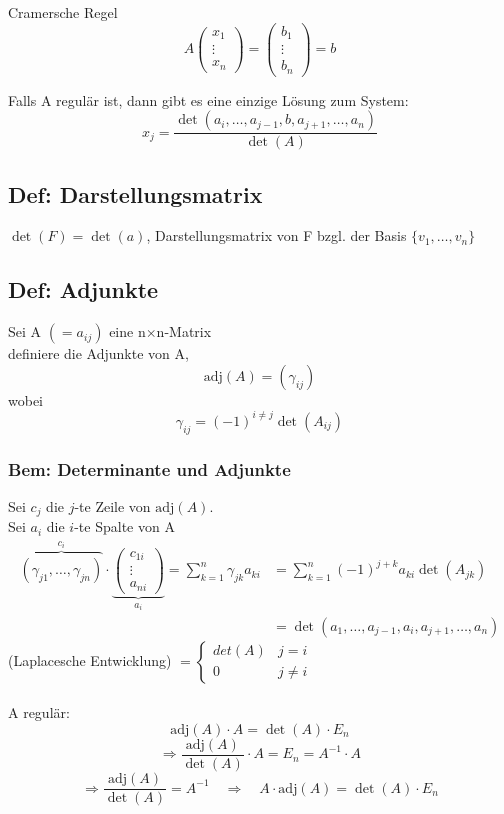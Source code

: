 \documentclass[titlepage,12pt,a4paper,ngerman]{report}
\newcommand{\tx}[1]{\textrm{#1}}
\begin{document}
Cramersche Regel
$$A \begin{pmatrix}
x_1\\
\vdots\\
x_n
\end{pmatrix}
= \begin{pmatrix}
b_1\\
\vdots\\
b_n
\end{pmatrix}
= b
$$

Falls A regulär ist, dann gibt es eine einzige Lösung zum System:
$$ x_j = \frac{\det(a_i,\dots,a_{j-1},b,a_{j+1},\dots , a_n)}{\det(A)}$$
\subsection{Def: Darstellungsmatrix}
$\det(F) = \det(a)$, Darstellungsmatrix von F bzgl. der Basis $\{v_1,\dots , v_n\}$
\subsection{Def: Adjunkte} Sei A $(= a_{ij})$ eine n$\times$n-Matrix\\
definiere die Adjunkte von A,  
$$\textrm{adj}(A) = (\gamma_{ij})$$ wobei $$\gamma_{ij} = (-1)^{i\neq j} \det(A_{ij})$$
\subsubsection{Bem: Determinante und Adjunkte}
Sei $c_j$ die $j$-te Zeile von $\textrm{adj}(A)$.\\
Sei $a_i$ die $i$-te Spalte von A 
\begin{align*}\overbrace{(\gamma_{j1}, \dots , \gamma_{jn})}^{c_i} \cdot \underbrace{\begin{pmatrix} c_{1i}\\ \vdots\\ a_{ni} \end{pmatrix}}_{a_i}  = \sum_{k=1}^n \gamma_{jk} a_{ki} &= \sum_{k=1}^n (-1)^{j+k} a_{ki} \det(A_{jk}) \\ &= \det(a_1, \dots , a_{j-1}, a_i , a_{j+1}, \dots , a_n) \end{align*}
(Laplacesche Entwicklung) $ = \left\{\begin{array}{ll} det(A) & j=i \\ 0 & j\neq i \end{array}\right.$\\\\
A regulär:
$$\tx{adj}(A) \cdot A = \det(A) \cdot E_n$$
$$\Rightarrow \frac{\tx{adj}(A)}{\det(A)} \cdot A = E_n = A^{-1} \cdot A$$
$$\Rightarrow \frac{\tx{adj}(A)}{\det(A)} = A^{-1} \quad \Rightarrow \quad A \cdot \tx{adj}(A) = \det(A) \cdot E_n$$
\end{document}
